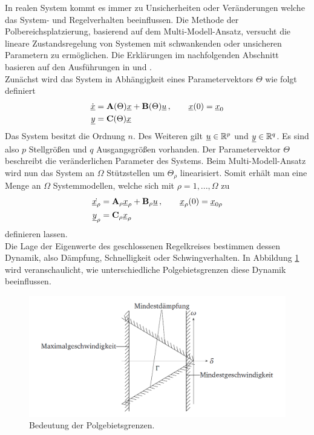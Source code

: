 In realen System kommt es immer zu Unsicherheiten oder Veränderungen welche das System- und Regelverhalten beeinflussen.
Die Methode der Polbereichsplatzierung, basierend auf dem  Multi-Modell-Ansatz, versucht die lineare Zustandsregelung von Systemen mit schwankenden oder unsicheren Parametern zu ermöglichen.
Die Erklärungen im nachfolgenden Abschnitt basieren auf den Ausführungen in \cite{RobReg} und \cite{Schaub}.\\
Zunächst wird das System in Abhängigkeit eines Parametervektors $\Theta$ wie folgt definiert
\begin{align}
	\dot{\underline{x}} &= \textbf{A}(\Theta)\underline{x} + \textbf{B}(\Theta)\underline{u}\, , \qquad \underline{x}(0) = \underline{x}_0\\
	\underline{y} 		&= \textbf{C}(\Theta)\underline{x}
\end{align}
Das System besitzt die Ordnung $n$. Des Weiteren gilt $\underline{u}\in\mathbb{R}^p$ und $\underline{y}\in\mathbb{R}^q$. Es sind also $p$ Stellgrößen und $q$ Ausgangsgrößen vorhanden.
Der Parametervektor $\Theta$ beschreibt die veränderlichen Parameter des Systems. Beim Multi-Modell-Ansatz wird nun das System an $\Omega$ Stützstellen um $\Theta_{\rho}$ linearisiert. Somit erhält man eine Menge an $\Omega$ Systemmodellen, welche sich mit $\rho = 1,...,\Omega$ zu 
\begin{align}
	\dot{\underline{x}_{\rho}} &= \textbf{A}_\rho \underline{x}_{\rho} + \textbf{B}_\rho\underline{u}\, , \qquad \underline{x}_{\rho}(0) = \underline{x}_{0\rho}\\
	\underline{y}_{\rho} 		 &= \textbf{C}_\rho\underline{x}_{\rho}
\end{align}
definieren lassen.\\
Die Lage der Eigenwerte des geschlossenen Regelkreises bestimmen dessen Dynamik, also Dämpfung, Schnelligkeit oder Schwingverhalten. In Abbildung \ref{fig:BedPolgebGrenzen} wird veranschaulicht, wie unterschiedliche Polgebietsgrenzen diese Dynamik beeinflussen. 
\begin{figure}[h]
	\centering
	\includegraphics[width=\textwidth]{./Bilder/BedPolgebGrenzen.png}
	\caption{Bedeutung der Polgebietsgrenzen.\cite{RobReg}}
	\label{fig:BedPolgebGrenzen}
\end{figure}
